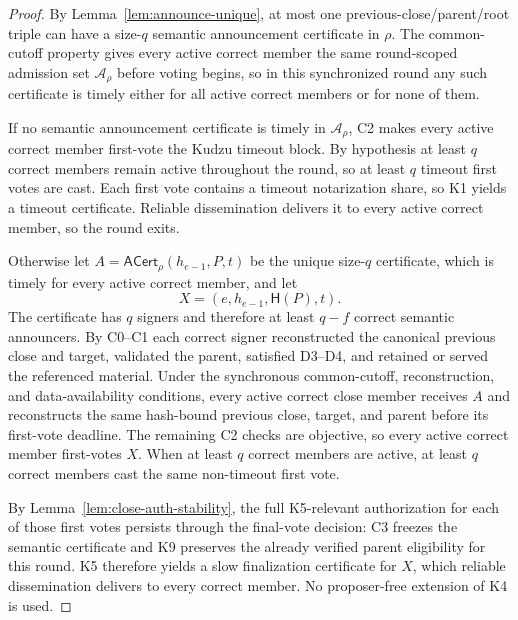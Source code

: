 \documentclass[11pt]{article}
\theoremstyle{definition}
\theoremstyle{remark}
\newcommand{\hash}{\mathsf{H}}
\newcommand{\ACert}{\mathsf{ACert}}
\begin{document}
\begin{proof}
By Lemma~\ref{lem:announce-unique}, at most one previous-close/parent/root triple can have a size-$q$ semantic announcement certificate in $\rho$. The common-cutoff property gives every active correct member the same round-scoped admission set $\mathcal A_\rho$ before voting begins, so in this synchronized round any such certificate is timely either for all active correct members or for none of them.

If no semantic announcement certificate is timely in $\mathcal A_\rho$, C2 makes every active correct member first-vote the Kudzu timeout block. By hypothesis at least $q$ correct members remain active throughout the round, so at least $q$ timeout first votes are cast. Each first vote contains a timeout notarization share, so K1 yields a timeout certificate. Reliable dissemination delivers it to every active correct member, so the round exits.

Otherwise let $A=\ACert_\rho(h_{e-1},P,t)$ be the unique size-$q$ certificate, which is timely for every active correct member, and let
\[
  X=(e,h_{e-1},\hash(P),t).
\]
The certificate has $q$ signers and therefore at least $q-f$ correct semantic announcers. By C0--C1 each correct signer reconstructed the canonical previous close and target, validated the parent, satisfied D3--D4, and retained or served the referenced material. Under the synchronous common-cutoff, reconstruction, and data-availability conditions, every active correct close member receives $A$ and reconstructs the same hash-bound previous close, target, and parent before its first-vote deadline. The remaining C2 checks are objective, so every active correct member first-votes $X$. When at least $q$ correct members are active, at least $q$ correct members cast the same non-timeout first vote.

By Lemma~\ref{lem:close-auth-stability}, the full K5-relevant authorization for each of those first votes persists through the final-vote decision: C3 freezes the semantic certificate and K9 preserves the already verified parent eligibility for this round. K5 therefore yields a slow finalization certificate for $X$, which reliable dissemination delivers to every correct member. No proposer-free extension of K4 is used.
\end{proof}
\end{document}
